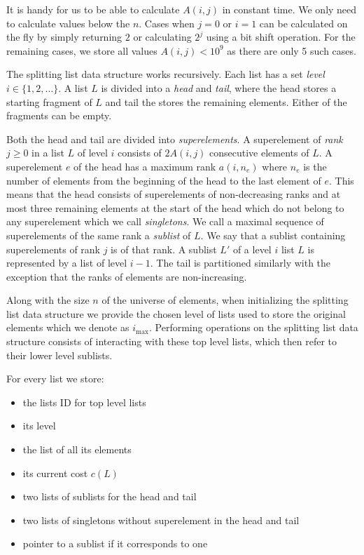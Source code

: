 It is handy for us to be able to calculate $A(i,j)$ in constant time. We only need to calculate values below the $n$. Cases when $j = 0$ or $i = 1$ can be calculated on the fly by simply returning $2$ or calculating $2^j$ using a bit shift operation. For the remaining cases, we store all values $A(i,j) < 10^9$ as there are only 5 such cases.

The splitting list data structure works recursively. Each list has a set \textit{level} $i \in \{1, 2, \dots \}$. A list $L$ is divided into a \textit{head} and \textit{tail}, where the head stores a starting fragment of $L$ and tail the stores the remaining elements. Either of the fragments can be empty. 

Both the head and tail are divided into \textit{superelements}. A superelement of \textit{rank} $j \geq 0$ in a list $L$ of level $i$ consists of $2A(i,j)$ consecutive elements of $L$. A superelement $e$ of the head has a maximum rank $a(i, n_e)$ where $n_e$ is the number of elements from the beginning of the head to the last element of $e$. This means that the head consists of superelements of non-decreasing ranks and at most three remaining elements at the start of the head which do not belong to any superelement which we call \textit{singletons}. We call a maximal sequence of superelements of the same rank a \textit{sublist} of $L$. We say that a sublist containing superelements of rank $j$ is of that rank. A sublist $L'$ of a level $i$ list $L$ is represented by a list of level $i-1$. The tail is partitioned similarly with the exception that the ranks of elements are non-increasing. 

Along with the size $n$ of the universe of elements, when initializing the splitting list data structure we provide the chosen level of lists used to store the original elements which we denote as $i_{\max}$. Performing operations on the splitting list data structure consists of interacting with these top level lists, which then refer to their lower level sublists.

For every list we store:

\begin{itemize}
    \item the lists ID for top level lists
    \item its level
    \item the list of all its elements
    \item its current cost $c(L)$
    \item two lists of sublists for the head and tail
    \item two lists of singletons without superelement in the head and tail
    \item pointer to a sublist if it corresponds to one
\end{itemize}


